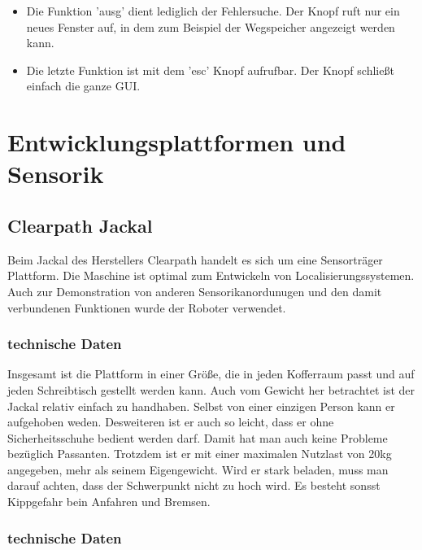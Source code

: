\documentclass[11pt]{scrartcl}
\begin{document}
\begin{onehalfspace}
\begin{itemize}
\item Die Funktion 'ausg' dient lediglich der Fehlersuche. Der Knopf ruft nur  ein neues Fenster auf, in dem zum Beispiel der Wegspeicher angezeigt werden kann.
\item Die letzte Funktion ist mit dem 'esc' Knopf aufrufbar. Der Knopf schließt einfach die ganze GUI.
\end{itemize}


\section{Entwicklungsplattformen und Sensorik}

\subsection{Clearpath Jackal}
Beim Jackal des Herstellers Clearpath handelt es sich um eine Sensorträger Plattform. Die Maschine ist optimal zum Entwickeln von Localisierungssystemen. Auch zur Demonstration von anderen Sensorikanordunugen und den damit verbundenen Funktionen wurde der Roboter verwendet.

\subsubsection{technische Daten}




Insgesamt ist die Plattform in einer Größe, die in jeden Kofferraum passt und  auf jeden Schreibtisch gestellt werden kann. Auch vom Gewicht her betrachtet ist der Jackal relativ einfach zu handhaben. Selbst von einer einzigen Person  kann er aufgehoben weden. Desweiteren ist er auch so leicht, dass er ohne Sicherheitsschuhe bedient werden darf. Damit hat man auch keine Probleme bezüglich Passanten. Trotzdem ist er mit einer maximalen Nutzlast von 20kg angegeben, mehr als seinem Eigengewicht. Wird er stark beladen, muss man darauf achten, dass der Schwerpunkt nicht zu hoch wird. Es besteht sonsst Kippgefahr bein Anfahren und Bremsen.\\

\subsubsection{technische Daten}


\end{onehalfspace}
\end{document}
